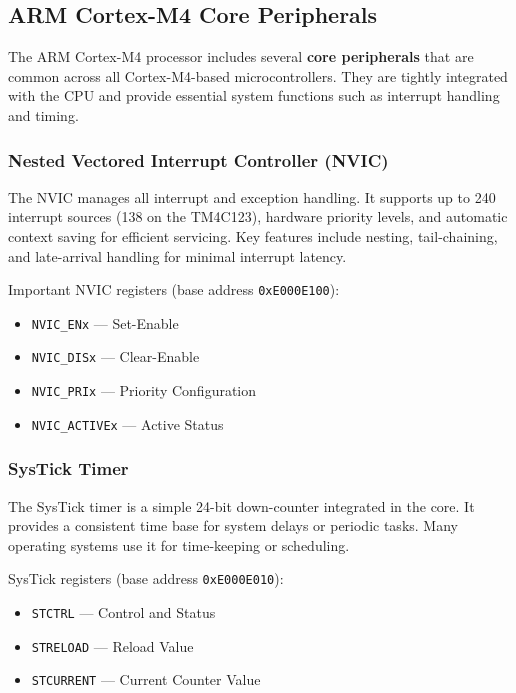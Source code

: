\subsection{ARM Cortex-M4 Core Peripherals}

The ARM Cortex-M4 processor includes several \textbf{core peripherals} that are common across all Cortex-M4-based microcontrollers.  
They are tightly integrated with the CPU and provide essential system functions such as interrupt handling and timing.

\subsubsection{Nested Vectored Interrupt Controller (NVIC)}

The NVIC manages all interrupt and exception handling.  
It supports up to 240 interrupt sources (138 on the TM4C123), hardware priority levels, and automatic context saving for efficient servicing.  
Key features include nesting, tail-chaining, and late-arrival handling for minimal interrupt latency.

\noindent Important NVIC registers (base address \texttt{0xE000E100}):
\begin{itemize}[nosep]
  \item \texttt{NVIC\_ENx} — Set-Enable  
  \item \texttt{NVIC\_DISx} — Clear-Enable  
  \item \texttt{NVIC\_PRIx} — Priority Configuration  
  \item \texttt{NVIC\_ACTIVEx} — Active Status
\end{itemize}

\subsubsection{SysTick Timer}

The SysTick timer is a simple 24-bit down-counter integrated in the core.  
It provides a consistent time base for system delays or periodic tasks.  
Many operating systems use it for time-keeping or scheduling.

\noindent SysTick registers (base address \texttt{0xE000E010}):
\begin{itemize}[nosep]
  \item \texttt{STCTRL} — Control and Status  
  \item \texttt{STRELOAD} — Reload Value  
  \item \texttt{STCURRENT} — Current Counter Value
\end{itemize}

